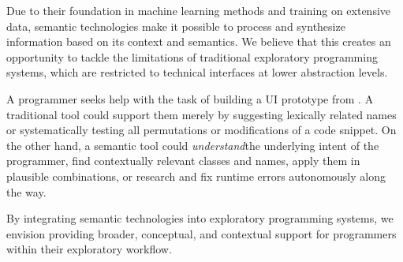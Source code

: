 \ParSep

Due to their foundation in machine learning methods and training on extensive data, semantic technologies make it possible to process and synthesize information based on its context and semantics.
We believe that this creates an opportunity to tackle the limitations of traditional exploratory programming systems, which are restricted to technical interfaces at lower abstraction levels.

\begin{example}
	A programmer seeks help with the task of building a UI prototype from .
	A traditional tool could support them merely by suggesting lexically related names or systematically testing all permutations or modifications of a code snippet.
	On the other hand, a semantic tool could \emph{understand}\footnotemark the underlying intent of the programmer, find contextually relevant classes and names, apply them in plausible combinations, or research and fix runtime errors autonomously along the way.
\end{example}

By integrating semantic technologies into exploratory programming systems, we envision providing broader, conceptual, and contextual support for programmers within their exploratory workflow.

